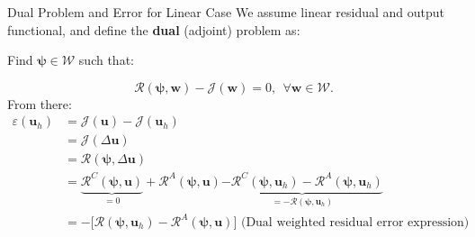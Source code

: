 \documentclass{beamer}
\newcounter{sectionframecount}
\begin{document}
\begin{frame}[t]{Dual Problem and Error for Linear Case}
  \vspace{-10pt}
  We assume linear residual and output functional, and define the \textbf{dual} (adjoint) problem as:

  \vspace{5pt}
  Find $\boldsymbol{\psi} \in \mathcal{W}$ such that:

  \begin{equation}
      \mathcal{R}(\boldsymbol{\psi},\boldsymbol{w}) - \mathcal{J}(\boldsymbol{w}) = 0, ~~\forall \boldsymbol{w} \in \mathcal{W}.
  \end{equation}
  From there:
  \vspace{2pt}
  \begin{equation}
    \begin{split}
        \varepsilon(\boldsymbol{u}_h) &= \mathcal{J}(\boldsymbol{u}) - \mathcal{J}(\boldsymbol{u}_h) \\
        &= \mathcal{J}(\Delta \boldsymbol{u})\\
        &=\mathcal{R}(\boldsymbol{\psi},\Delta \boldsymbol{u}) \\
        &= \underbrace{\mathcal{R}^C(\boldsymbol{\psi},\boldsymbol{u})}_{= 0} + \mathcal{R}^A(\boldsymbol{\psi},\boldsymbol{u}) \underbrace{- \mathcal{R}^C(\boldsymbol{\psi},\boldsymbol{u}_h) - \mathcal{R}^A(\boldsymbol{\psi},\boldsymbol{u}_h)}_{=-\mathcal{R}(\boldsymbol{\psi},\boldsymbol{u}_h)}\\
        &= -\Big[\mathcal{R}(\boldsymbol{\psi},\boldsymbol{u}_h) - \mathcal{R}^A(\boldsymbol{\psi},\boldsymbol{u})\Big]\text{ (Dual weighted residual error expression)}
    \end{split}
  \end{equation}
\end{frame}

\end{document}
